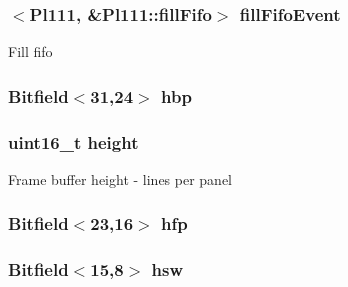\label{classPl111_abf8ed1a0152ea70d689ffce800cd32fd}
\hypertarget{classPl111_ae4caf4c339850803aeea275f13b63c39}{
\subsubsection[{fillFifoEvent}]{$<${\bf Pl111}, \&Pl111::fillFifo$>$ {\bf fillFifoEvent}}}
\label{classPl111_ae4caf4c339850803aeea275f13b63c39}
Fill fifo \hypertarget{classPl111_a49df0f89b9fa1e135522674810b9fa1e}{
\subsubsection[{hbp}]{\setlength{\rightskip}{0pt plus 5cm}Bitfield$<$31,24$>$ {\bf hbp}}}
\label{classPl111_a49df0f89b9fa1e135522674810b9fa1e}
\hypertarget{classPl111_a81c9f8d0b8c3b49d770be14dbe9f0d37}{
\subsubsection[{height}]{\setlength{\rightskip}{0pt plus 5cm}uint16\_\-t {\bf height}}}
\label{classPl111_a81c9f8d0b8c3b49d770be14dbe9f0d37}
Frame buffer height -\/ lines per panel \hypertarget{classPl111_af163f5f60393a40cd898b5489d3e5901}{
\subsubsection[{hfp}]{\setlength{\rightskip}{0pt plus 5cm}Bitfield$<$23,16$>$ {\bf hfp}}}
\label{classPl111_af163f5f60393a40cd898b5489d3e5901}
\hypertarget{classPl111_aa182f542482835ddda6ef4d523791f30}{
\subsubsection[{hsw}]{\setlength{\rightskip}{0pt plus 5cm}Bitfield$<$15,8$>$ {\bf hsw}}}
